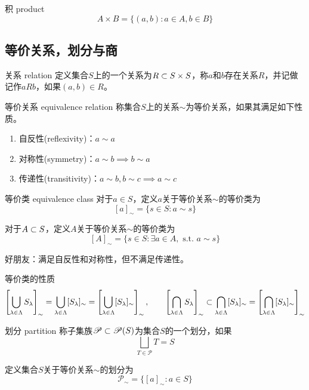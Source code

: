\begin{definition}{积 product}
	$$
	A\times B=\{ (a,b):a\in A,b\in B \}
	$$
\end{definition}

\subsection{等价关系，划分与商}

\begin{definition}{关系 relation}
	定义集合$S$上的一个关系为$R\subset S\times S$，称$a$和$b$存在关系$R$，并记做记作$aRb$，如果$(a,b)\in R$。
\end{definition}

\begin{definition}{等价关系 equivalence relation}
	称集合$S$上的关系$\sim $为等价关系，如果其满足如下性质。
	\begin{enumerate}
		\item 自反性(reflexivity)：$a\sim a$
		\item 对称性(symmetry)：$a\sim b\implies b\sim a$
		\item 传递性(transitivity)：$a\sim b,b\sim c\implies a\sim c$
	\end{enumerate}
\end{definition}

\begin{definition}{等价类 equivalence class}
	对于$a\in S$，定义$a$关于等价关系$\sim$的等价类为
	$$
	[a]_\sim=\{ s\in S:a\sim s \}
	$$
	
	对于$A\subset S$，定义$A$关于等价关系$\sim$的等价类为
	$$
	[A]_\sim=\{ s\in S:\exists a\in A,\text{ s.t. }a\sim s \}
	$$
\end{definition}

\begin{example}
	好朋友：满足自反性和对称性，但不满足传递性。
\end{example}

\begin{proposition}{等价类的性质}
	$$
	\left[ \bigcup_{\lambda\in\Lambda}S_\lambda \right]_\sim
	=\bigcup_{\lambda\in\Lambda}[S_\lambda]_\sim=\left[ \bigcup_{\lambda\in\Lambda}[S_\lambda]_\sim \right]_\sim,\qquad
	\left[ \bigcap_{\lambda\in\Lambda}S_\lambda \right]_\sim
	\subset \bigcap_{\lambda\in\Lambda}[S_\lambda]_\sim=\left[ \bigcap_{\lambda\in\Lambda}[S_\lambda]_\sim \right]_\sim
	$$
\end{proposition}

\begin{definition}{划分 partition}
	称子集族$\mathscr{P}\subset\mathscr{P}(S)$为集合$S$的一个划分，如果
	$$
	\bigsqcup_{T\in\mathscr{P}}T=S
	$$
	
	定义集合$S$关于等价关系$\sim$的划分为
	$$
	\mathscr{P}_\sim=\{ [a]_\sim:a\in S \}
	$$
\end{definition}

